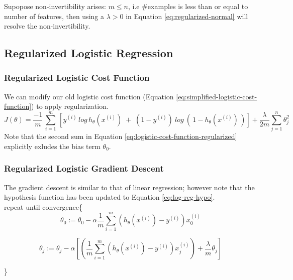                 Supopose non-invertibility arises: $m \leq n$, i.e #examples is less than or equal to number of features, then using a $\lambda > 0$ in Equation \ref{eq:regularized-normal} will resolve the non-invertibility.



    \subsection{Regularized Logistic Regression}
            
        \subsubsection{Regularized Logistic Cost Function}
        We can modify our old logistic cost function (Equation \ref{eq:simplified-logistic-cost-function}) to apply regularization. 
                    \begin{equation}
                        \boxed{
                        J(\theta) = \frac{-1}{m} \, \sum_{i=1}^{m}\, [ y^{(i)}\, log\, h_\theta (x^{(i)})\; +\; (1-y^{(i)})\: log\:(\,1-h_\theta(x^{(i)})\,) ] + \frac{\lambda}{2m} \sum_{j=1}^{n} \theta_j^2
                    }
                        \label{eq:logistic-cost-function-regularized}
                    \end{equation}
                    Note that the second sum in Equation \ref{eq:logistic-cost-function-regularized} explicitly exludes the bias term $\theta_0$. 



        \subsubsection{Regularized Logistic Gradient Descent}
            The gradient descent is similar to that of linear regression; however note that the hypothesis function has been updated to Equation \ref{eq:log-reg-hypo}.\\

               repeat until convergence\{  
            \[ \theta_0 := \theta_0 - \alpha \frac{1}{m} \sum_{i=1}^{m} ( h_\theta (x^{(i)}) - y^{(i)}) x_0^{(i)}\] 

            \[
                \theta_j := \theta_j - \alpha [ ( \frac{1}{m} \sum_{i=1}^{m} ( h_\theta (x^{(i)}) - y^{(i)}) x_j^{(i)} ) + \frac{\lambda}{m}\theta_j]
            \] 

        \}




